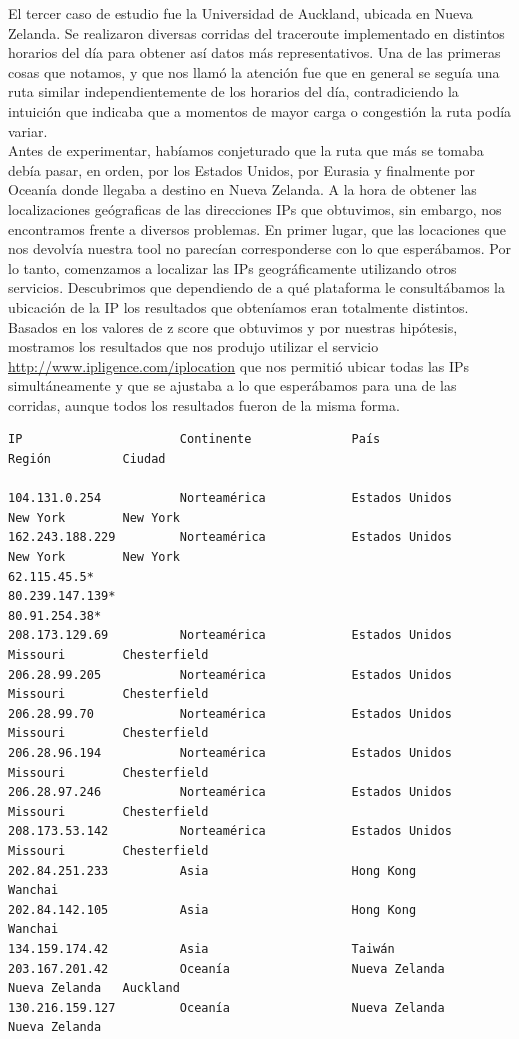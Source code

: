 \indent \indent El tercer caso de estudio fue la Universidad de Auckland, ubicada en Nueva Zelanda. Se realizaron diversas corridas del traceroute implementado en distintos horarios del día para obtener así datos más representativos. Una de las primeras cosas que notamos, y que nos llamó la atención fue que en general se seguía una ruta similar independientemente de los horarios del día, contradiciendo la intuición que indicaba que a momentos de mayor carga o congestión la ruta podía variar.\\
\indent Antes de experimentar, habíamos conjeturado que la ruta que más se tomaba debía pasar, en orden, por los Estados Unidos, por Eurasia y finalmente por Oceanía donde llegaba a destino en Nueva Zelanda. A la hora de obtener las localizaciones geógraficas de las direcciones IPs que obtuvimos, sin embargo, nos encontramos frente a diversos problemas. En primer lugar, que las locaciones que nos devolvía nuestra tool no parecían corresponderse con lo que esperábamos. Por lo tanto, comenzamos a localizar las IPs geográficamente utilizando otros servicios. Descubrimos que dependiendo de a qué plataforma le consultábamos la ubicación de la IP los resultados que obteníamos eran totalmente distintos. Basados en los valores de z score que obtuvimos y por nuestras hipótesis, mostramos los resultados que nos produjo utilizar el servicio \url{http://www.ipligence.com/iplocation} que nos permitió ubicar todas las IPs simultáneamente y que se ajustaba a lo que esperábamos para una de las corridas, aunque todos los resultados fueron de la misma forma.\\

\begin{verbatim}
IP                      Continente              País                Región          Ciudad

104.131.0.254           Norteamérica            Estados Unidos      New York        New York 	
162.243.188.229         Norteamérica            Estados Unidos      New York        New York 	
62.115.45.5* 						
80.239.147.139* 						
80.91.254.38* 						
208.173.129.69          Norteamérica            Estados Unidos      Missouri        Chesterfield 	
206.28.99.205           Norteamérica            Estados Unidos      Missouri        Chesterfield 	
206.28.99.70            Norteamérica            Estados Unidos      Missouri        Chesterfield 	
206.28.96.194           Norteamérica            Estados Unidos      Missouri        Chesterfield 	
206.28.97.246           Norteamérica            Estados Unidos      Missouri        Chesterfield 	
208.173.53.142          Norteamérica            Estados Unidos      Missouri        Chesterfield 	
202.84.251.233          Asia                    Hong Kong           Wanchai 	
202.84.142.105          Asia                    Hong Kong           Wanchai 	
134.159.174.42          Asia                    Taiwán 			
203.167.201.42          Oceanía                 Nueva Zelanda       Nueva Zelanda   Auckland 	
130.216.159.127         Oceanía                 Nueva Zelanda       Nueva Zelanda 		

\end{verbatim}


